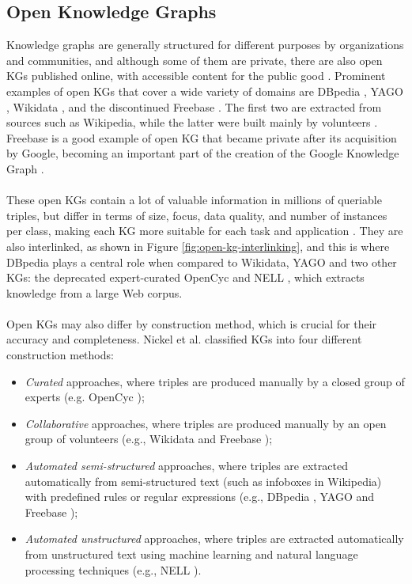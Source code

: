 \documentclass[11pt,titlepage,oneside,openany]{book}
\begin{document}
\subsection{Open Knowledge Graphs}
\label{subsec:open-kg}

Knowledge graphs are generally structured for different purposes by organizations and communities, and although some of them are private, there are also open KGs published online, with accessible content for the public good \cite{hogan_knowledge_2022}. Prominent examples of open KGs that cover a wide variety of domains are DBpedia \cite{lehmann_dbpedia_2015}, YAGO \cite{suchanek_yago_2007}, Wikidata \cite{vrandecic_wikidata_2014}, and the discontinued Freebase \cite{bollacker_freebase_2008}. The first two are extracted from sources such as Wikipedia, while the latter were built mainly by volunteers \cite{hogan_knowledge_2022}. Freebase is a good example of open KG that became private after its acquisition by Google, becoming an important part of the creation of the Google Knowledge Graph \cite{singhal_introducing_2012}.\\
\\
These open KGs contain a lot of valuable information in millions of queriable triples, but differ in terms of size, focus, data quality, and number of instances per class, making each KG more suitable for each task and application \cite{kern-isberner_one_2017}. They are also interlinked, as shown in Figure \ref{fig:open-kg-interlinking}, and this is where DBpedia plays a central role when compared to Wikidata, YAGO and two other KGs: the deprecated expert-curated OpenCyc \cite{lenat_cyc_1998} and NELL \cite{carlson_toward_2010}, which extracts knowledge from a large Web corpus.\\
\\
Open KGs may also differ by construction method, which is crucial for their accuracy and completeness. Nickel et al. \cite{nickel_review_2016} classified KGs into four different construction methods:

\begin{itemize}
    \item \textit{Curated} approaches, where triples are produced manually by a closed group of experts (e.g. OpenCyc \cite{lenat_cyc_1998});
    \item \textit{Collaborative} approaches, where triples are produced manually by an open group of volunteers (e.g., Wikidata \cite{vrandecic_wikidata_2014} and Freebase \cite{bollacker_freebase_2008});
    \item \textit{Automated semi-structured} approaches, where triples are extracted automatically from semi-structured text (such as infoboxes in Wikipedia) with predefined rules or regular expressions (e.g., DBpedia \cite{lehmann_dbpedia_2015}, YAGO \cite{suchanek_yago_2007} and Freebase \cite{bollacker_freebase_2008});
    \item \textit{Automated unstructured} approaches, where triples are extracted automatically from unstructured text using machine learning and natural language processing techniques (e.g., NELL \cite{carlson_toward_2010}).
\end{itemize}
\end{document}
